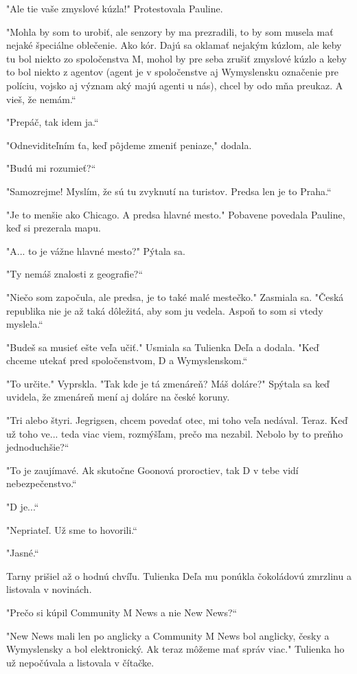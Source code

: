 \documentclass{book}
\begin{document}
"$ $Ale tie vaše zmyslové kúzla!"$ $ Protestovala Pauline.

"$ $Mohla by som to urobiť, ale senzory by ma prezradili, to by som musela mať nejaké špeciálne oblečenie. Ako kór. Dajú sa oklamať nejakým kúzlom, ale keby tu bol niekto zo spoločenstva M, mohol by pre seba zrušiť zmyslové kúzlo a keby to bol niekto z agentov (agent je v spoločenstve aj Wymyslensku označenie pre políciu, vojsko aj význam aký majú agenti u nás), chcel by odo mňa preukaz. A vieš, že nemám.“

"$ $Prepáč, tak idem ja.“

"$ $Odneviditeľním ťa, keď pôjdeme zmeniť peniaze,"$ $ dodala.

"$ $Budú mi rozumieť?“

"$ $Samozrejme! Myslím, že sú tu zvyknutí na turistov. Predsa len je to Praha.“

"$ $Je to menšie ako Chicago. A predsa hlavné mesto."$ $ Pobavene povedala Pauline, keď si prezerala mapu.

"$ $A... to je vážne hlavné mesto?"$ $ Pýtala sa.

"$ $Ty nemáš znalosti z geografie?“

"$ $Niečo som započula, ale predsa, je to také malé mestečko."$ $ Zasmiala sa. "$ $Česká republika nie je až taká dôležitá, aby som ju vedela. Aspoň to som si vtedy myslela.“

"$ $Budeš sa musieť ešte veľa učiť."$ $ Usmiala sa Tulienka Deľa a dodala. "$ $Keď chceme utekať pred spoločenstvom, D a Wymyslenskom.“

"$ $To určite."$ $ Vyprskla. "$ $Tak kde je tá zmenáreň? Máš doláre?"$ $ Spýtala sa keď uvidela, že zmenáreň mení aj doláre na české koruny.

"$ $Tri alebo štyri. Jegrigsen, chcem povedať otec, mi toho veľa nedával. Teraz. Keď už toho ve... teda viac viem, rozmýšľam, prečo ma nezabil. Nebolo by to preňho jednoduchšie?“

"$ $To je zaujímavé. Ak skutočne Goonová proroctiev, tak D v tebe vidí nebezpečenstvo.“

"$ $D je...“

"$ $Nepriateľ. Už sme to hovorili.“

"$ $Jasné.“

Tarny prišiel až o hodnú chvíľu. Tulienka Deľa mu ponúkla čokoládovú zmrzlinu a listovala v novinách.

"$ $Prečo si kúpil Community M News a nie New News?“

"$ $New News mali len po anglicky a Community M News bol anglicky, česky a Wymyslensky a bol elektronický. Ak teraz môžeme mať správ viac."$ $ Tulienka ho už nepočúvala a listovala v čítačke.
\end{document}
